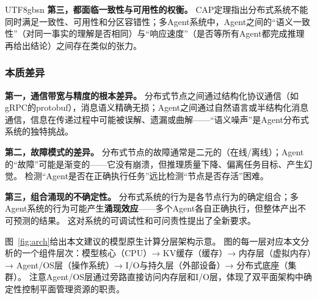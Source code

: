 \documentclass[11pt,a4paper]{article}
\begin{document}
\begin{CJK*}{UTF8}{gbsn}
\textbf{第三，都面临一致性与可用性的权衡。}
CAP定理指出分布式系统不能同时满足一致性、可用性和分区容错性\cite{cap2002}；多Agent系统中，Agent之间的``语义一致性''（对同一事实的理解是否相同）与``响应速度''（是否等所有Agent都完成推理再给出结论）之间存在类似的张力。

\subsubsection{本质差异}

\textbf{第一，通信带宽与精度的根本差异。}
分布式节点之间通过结构化协议通信（如gRPC的protobuf），消息语义精确无损；Agent之间通过自然语言或半结构化消息通信，信息在传递过程中可能被误解、遗漏或曲解——``语义噪声''是Agent分布式系统的独特挑战。

\textbf{第二，故障模式的差异。}
分布式节点的故障通常是二元的（在线/离线）；Agent的``故障''可能是渐变的——它没有崩溃，但推理质量下降、偏离任务目标、产生幻觉。
检测``Agent是否在正确执行任务''远比检测``节点是否存活''困难。

\textbf{第三，组合涌现的不确定性。}
分布式系统的行为是各节点行为的确定组合；多Agent系统的行为可能产生\textbf{涌现效应}——多个Agent各自正确执行，但整体产出不可预测的结果。
这对系统的可调试性和可问责性提出了全新要求。


图~\ref{fig:arch}给出本文建议的模型原生计算分层架构示意。
图的每一层对应本文分析的一个组件层次：模型核心（CPU）→ KV缓存（缓存）→ 内存层（虚拟内存）→ Agent/OS层（操作系统）→ I/O与持久层（外部设备）→ 分布式底座（集群）。
注意Agent/OS层通过旁路直接访问内存层和I/O层，体现了双平面架构中确定性控制平面管理资源的职责。


\end{CJK*}
\end{document}
